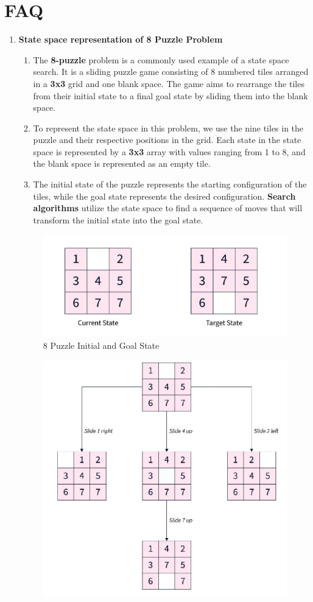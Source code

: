 \documentclass[11pt]{article}
\begin{document}
\section{FAQ}
\begin{enumerate}
    \item \textbf{State space representation of 8 Puzzle Problem}\\

          \begin{enumerate}
              \item The \textbf{8-puzzle} problem is a commonly used example of a state space search. It is a sliding
                    puzzle game consisting of 8 numbered tiles arranged in a \textbf{3x3} grid and one blank space.
                    The game aims to rearrange the tiles from their initial state to a final goal state by sliding
                    them into the blank space.
              \item To represent the state space in this problem, we use the nine tiles in the puzzle and their
                    respective positions in the grid. Each state in the state space is represented by a \textbf{3x3} array
                    with values ranging from 1 to 8, and the blank space is represented as an empty tile.
              \item The initial state of the puzzle represents the starting configuration of the tiles, while the
                    goal state represents the desired configuration. \textbf{Search algorithms} utilize the state space
                    to find a sequence of moves that will transform the initial state into the goal state.
          \end{enumerate}
          \begin{figure}[H]
              \centering
              \includegraphics[width=.45\textwidth]{8_queens1.png}
              \caption{8 Puzzle Initial and Goal State}
          \end{figure}
          \begin{figure}[H]
              \centering
              \includegraphics[width=.55\textwidth]{8_queens2.png}

\end{figure}
\end{enumerate}
\end{document}
